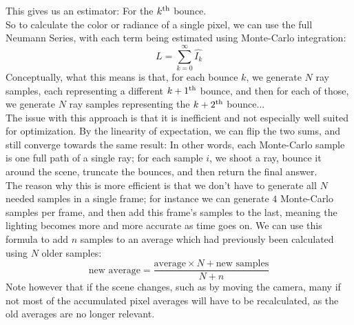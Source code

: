 \documentclass[12pt]{article}
\begin{document}
This gives us an estimator:
For the $k^{\text{th}}$ bounce. \\

So to calculate the color or radiance of a single pixel,
we can use the full Neumann Series, with each term
being estimated using Monte-Carlo integration:
\[ L = \sum_{k=0}^\infty \widehat{I_k} \]
Conceptually, what this means is that, for each
bounce $k$, we generate $N$ ray samples,
each representing a different $k+1^{\text{th}}$ bounce,
and then for each of those, we generate
$N$ ray samples representing the $k+2^{\text{th}}$ bounce... \\

The issue with this approach is that it is inefficient
and not especially well suited for optimization.
By the linearity of expectation, we can flip
the two sums, and still converge towards the same 
result:
In other words, each Monte-Carlo sample is one full
path of a single ray; for each sample $i$,
we shoot a ray, bounce it around the scene,
truncate the bounces, and then return the final answer. \\

The reason why this is more efficient is that we 
don't have to generate all $N$ needed samples in a 
single frame; for instance we can generate $4$
Monte-Carlo samples per frame, and then add
this frame's samples to the last, meaning the lighting
becomes more and more accurate as time goes on.
We can use this formula to add $n$ samples to an average
which had previously been calculated using $N$
older samples:
\[ \text{new average} = 
\dfrac{\text{average} \times N + 
\text{new samples}}{N + n} \]
Note however that if the scene changes, such as by moving
the camera, many if not most of the accumulated
pixel averages will have to be recalculated,
as the old averages are no longer relevant. \\
\end{document}
